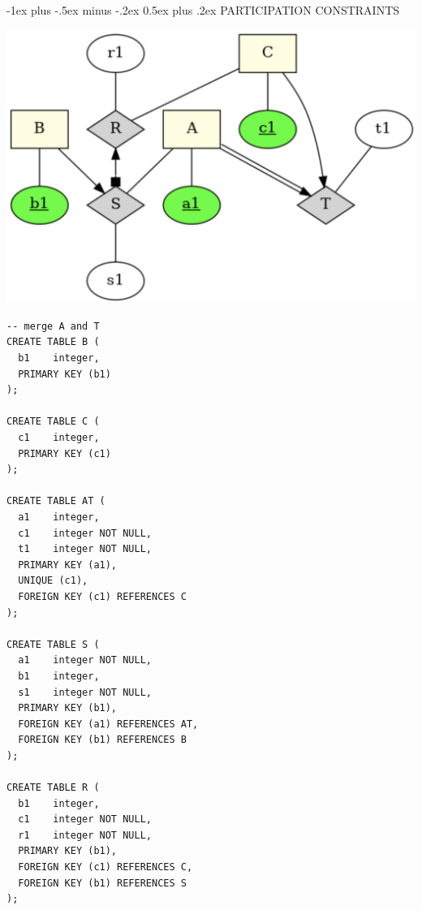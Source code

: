 \documentclass[10pt, landscape]{article}
\makeatletter
\renewcommand{\section}{\@startsection{section}{1}{0mm}%
  {-1ex plus -.5ex minus -.2ex}%
  {0.5ex plus .2ex}%
{\normalfont\large\bfseries}}
\makeatother
\begin{document}
\begin{multicols*}{3}
  \section{PARTICIPATION CONSTRAINTS}
  \begin{tightcenter}
    \includegraphics[width=0.9\linewidth]{cs2102-er-model-participation-constraints.png} 
  \end{tightcenter}
  \begin{lstlisting}[style=mySQL]
-- merge A and T
CREATE TABLE B (
  b1 	integer,
  PRIMARY KEY (b1)
);

CREATE TABLE C (
  c1 	integer,
  PRIMARY KEY (c1)
);

CREATE TABLE AT (
  a1 	integer,
  c1 	integer NOT NULL,
  t1 	integer NOT NULL,
  PRIMARY KEY (a1),
  UNIQUE (c1),
  FOREIGN KEY (c1) REFERENCES C
);

CREATE TABLE S (
  a1 	integer NOT NULL,
  b1 	integer,
  s1 	integer NOT NULL,
  PRIMARY KEY (b1),
  FOREIGN KEY (a1) REFERENCES AT,
  FOREIGN KEY (b1) REFERENCES B
);

CREATE TABLE R (
  b1 	integer,
  c1 	integer NOT NULL,
  r1 	integer NOT NULL,
  PRIMARY KEY (b1),
  FOREIGN KEY (c1) REFERENCES C,
  FOREIGN KEY (b1) REFERENCES S
);
  \end{lstlisting}

\end{multicols*}
\end{document}
